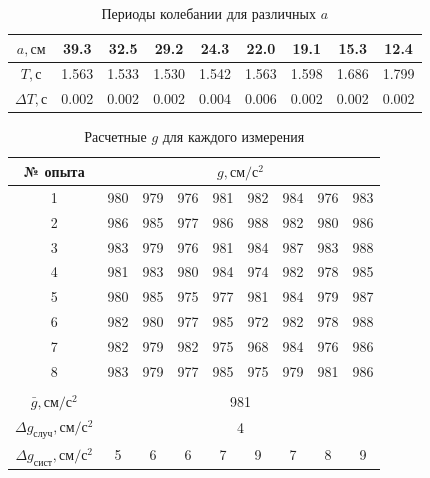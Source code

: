 \documentclass[a4paper, 12pt]{article}
\begin{document}
    \begin{table}[h!]
        \begin{center}

         \begin{tabular}{|c|c|c|c|c|c|c|c|c|}
            \hline
            \textbf{$a, см$} & 39.3 & 32.5 & 29.2 & 24.3 & 22.0 & 19.1 & 15.3 & 12.4\\
            \hline
            \textbf{$T, с$} & 1.563 & 1.533 & 1.530  & 1.542 & 1.563 & 1.598 & 1.686 & 1.799\\
            \hline
            \textbf{$\Delta T, с$} & 0.002 & 0.002 & 0.002 & 0.004 & 0.006 & 0.002 & 0.002 & 0.002\\
            \hline
         \end{tabular}
         \caption{Периоды колебании для различных $a$}
        \end{center}

    \end{table}

    \begin{table}[h!]
        \begin{center}

         \begin{tabular}{|c|c|c|c|c|c|c|c|c|}
            \hline
            № опыта & \multicolumn{8}{c|}{$g, см/с^{2}$} \\
            \hline
            1 & 980 & 979 & 976 & 981 & 982 & 984 & 976 & 983 \\
            2 & 986 & 985 & 977 & 986 & 988 & 982 & 980 & 986 \\
            3 & 983 & 979 & 976 & 981 & 984 & 987 & 983 & 988 \\
            4 & 981 & 983 & 980 & 984 & 974 & 982 & 978 & 985 \\
            5 & 980 & 985 & 975 & 977 & 981 & 984 & 979 & 987 \\
            6 & 982 & 980 & 977 & 985 & 972 & 982 & 978 & 988 \\
            7 & 982 & 979 & 982 & 975 & 968 & 984 & 976 & 986 \\
            8 & 983 & 979 & 977 & 985 & 975 & 979 & 981 & 986 \\
            \hline
            \multicolumn{9}{c}{}\\
            \hline
            $\bar{g}, см/с^{2}$ & \multicolumn{8}{c|}{981}\\
            \hline
            $\Delta g_{случ}, см/с^{2}$ & \multicolumn{8}{c|}{4}\\
            \hline
            $\Delta g_{сист}, см/с^{2}$ &5 & 6 & 6 & 7 & 9 & 7 & 8 & 9\\
            \hline
         \end{tabular}
         \caption{Расчетные $g$ для каждого измерения}
        \end{center}

    \end{table}
    \newpage
\end{document}
